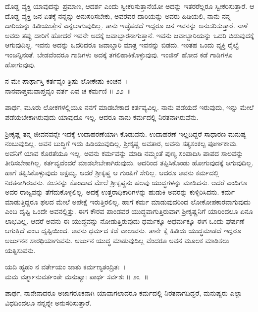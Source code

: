 ದೊಡ್ಡ ವ್ಯಕ್ತಿ ಯಾವುದನ್ನು ಪ್ರಮಾಣ, ಆದರ್ಶ ಎಂದು ಸ್ವೀಕರಿಸುತ್ತಾನೆಯೋ ಅದನ್ನು ಇತರರೆಲ್ಲರೂ ಸ್ವೀಕರಿಸುತ್ತಾರೆ. ಆ ದೊಡ್ಡ ವ್ಯಕ್ತಿ ಜನ ಏತಕ್ಕೆ ನನ್ನನ್ನು ಅನುಸರಿಸಬೇಕು, ಅವರವರ ದಾರಿಯನ್ನು ಅವರು ಹಿಡಿಯಲಿ, ನಾನು ನನ್ನ ದಾರಿಯನ್ನು ಹಿಡಿಯುತ್ತೇನೆ ಎನ್ನಲಾಗುವುದಿಲ್ಲ. ತಾನು ಇಚ್ಛೆಪಡದೆ ಇದ್ದರೂ ಜನ ಇವನನ್ನು ಅನುಸರಿಸುತ್ತಾರೆ. ನಾಳೆ ಅವರು ತಪ್ಪು ದಾರಿಗೆ ಹೋದರೆ ಇವನೇ ಅದಕ್ಕೆ ಜವಾಬ್ದಾರನಾಗುತ್ತಾನೆ. ಇವನು ಜವಾಬ್ದಾರಿಯನ್ನು ಒದರಿ ಬಿಡುವುದಕ್ಕೆ ಆಗುವುದಿಲ್ಲ. ಇವನು ಅದನ್ನು ಒದರಿದರೂ ಜವಾಬ್ದಾರಿ ಮಾತ್ರ ಇವನನ್ನು ಬಿಡದು. ಇಂತಹ ಒಂದು ವ್ಯಕ್ತಿ ರೈಲ್ವೆ ಇಂಜನ್ನಿನಂತೆ. ಬೇಡವೆಂದರೂ ಗಾಡಿಗಳು ಅದಕ್ಕೆ ತಗಲಿಹಾಕಿಕೊಳ್ಳುವುವು. ಇಂಜಿನ್ ಹೋದ ಕಡೆ ಗಾಡಿಗಳೂ ಹೋಗುವುವು.

\begin{shloka}
ನ ಮೇ ಪಾರ್ಥಾಸ್ತಿ ಕರ್ತವ್ಯಂ ತ್ರಿಷು ಲೋಕೇಷು ಕಿಂಚನ~।\\ನಾನವಾಪ್ತಮವಾಪ್ತವ್ಯಂ ವರ್ತ ಏವ ಚ ಕರ್ಮಣಿ \hfill॥ ೨೨~॥
\end{shloka}

\begin{artha}
ಪಾರ್ಥ, ಮೂರು ಲೋಕಗಳಲ್ಲಿಯೂ ನನಗೆ ಮಾಡಬೇಕಾದ ಕರ್ತವ್ಯವಿಲ್ಲ. ನಾನು ಪಡೆಯದೆ ಇರುವುದು, ಇನ್ನು ಮೇಲೆ ಪಡೆಯಬೇಕಾಗಿರುವುದು ಯಾವುದೂ ಇಲ್ಲ. ಆದರೂ ನಾನು ಕರ್ಮದಲ್ಲಿ ನಿರತನಾಗಿರುವೆನು.
\end{artha}

ಶ‍್ರೀಕೃಷ್ಣ ತನ್ನ ಜೀವನವನ್ನೇ ಇದಕ್ಕೆ ಉದಾಹರಣೆಯಾಗಿ ಕೊಡುವನು. ಉದಾಹರಣೆ ಇಲ್ಲದಿದ್ದರೆ ಸಾಧಾರಣ ಮನುಷ್ಯ ನಂಬುವುದಿಲ್ಲ. ಅವನ ಬುದ್ಧಿಗೆ ಇದು ಹಿಡಿಯುವುದಿಲ್ಲ. ಶ‍್ರೀಕೃಷ್ಣ ಅವತಾರ, ಅವನು ಸತ್ಯಸಂಕಲ್ಪ ಪೂರ್ಣಕಾಮ. ಅವನಿಗೆ ಯಾವ ಕೊರತೆಯೂ ಇಲ್ಲ. ಅವನು ಕರ್ಮವನ್ನು ಮಾಡಿ ನಮ್ಮಂತೆ ಪುಣ್ಯ ಸಂಪಾದಿಸಿ ಪಾಪದ ಸಾಲವನ್ನು ತೀರಿಸಬೇಕಾಗಿಲ್ಲ. ಕರ್ತವ್ಯವೆಂದರೆ ಮಾಡಲೇಬೇಕಾಗಿರುವುದು. ಅದರಿಂದ ತಪ್ಪಿಸಿಕೊಂಡು ಹೋಗುವುದಕ್ಕೆ ಆಗುವುದಿಲ್ಲ. ಹಾಗೆ ತಪ್ಪಿಸಿಕೊಳ್ಳುವುದು ಅಕ್ಷಮ್ಯ. ಆದರೆ ಶ‍್ರೀಕೃಷ್ಣ ಆ ಗುಂಪಿಗೆ ಸೇರಿಲ್ಲ. ಆದರೂ ಅವನು ಕರ್ಮದಲ್ಲಿ ನಿರತನಾಗಿರುವನು. ಕಂಸನನ್ನು ಕೊಂದಾದ ಮೇಲೆ ಶ‍್ರೀಕೃಷ್ಣನು ಹಲವು ಯುದ್ಧಗಳನ್ನು ಮಾಡಿದನು. ಆದರೆ ಎಂದಿಗೂ ಅವರ ರಾಜ್ಯವನ್ನು ತೆಗೆದುಕೊಳ್ಳಲಿಲ್ಲ. ಅದಕ್ಕೆ ಉತ್ತರಾಧಿಕಾರಿಗಳನ್ನು ಹುಡುಕಿ ಅವರನ್ನು ಕುಳ್ಳಿರಿಸಿದನು. ಕರ್ಮ ಮಾಡುತ್ತಿದ್ದರೂ ಫಲದ ಮೇಲೆ ಅಪೇಕ್ಷೆ ಇರುತ್ತಿರಲಿಲ್ಲ. ಹಾಗೆ ಕರ್ಮ ಮಾಡುವುದರಿಂದ ಲೋಕೋಪಕಾರವಾಗುವುದು ಎಂಬ ದೃಷ್ಟಿ ಒಂದೇ ಅವನಲ್ಲಿತ್ತು. ಈಗ ಕೌರವ ಪಾಂಡವರ ಯುದ್ಧವಾಗುತ್ತಿರುವಾಗ ಶ‍್ರೀಕೃಷ್ಣನಿಗೆ ಯಾರಿಂದಲೂ ಏನೂ ಲಾಭವಿಲ್ಲ. ಆದರೆ ಅವನು ಈ ಯುದ್ಧವನ್ನು ನೋಡುತ್ತಿರುವುದು ಧರ್ಮಕ್ಕೂ ಅಧರ್ಮಕ್ಕೂ ಈಗ ಒಂದು ಘರ್ಷಣೆ ಆಗುತ್ತಿದೆ ಎಂಬ ದೃಷ್ಟಿಯಿಂದ. ಅವನು ಧರ್ಮದ ಕಡೆ ವಾಲುವನು. ತಾನೇ ಕೈ ಹಿಡಿದು ಯುದ್ಧಮಾಡದೆ ಇದ್ದರೂ ಅರ್ಜುನನ ಸಾರಥಿಯಾಗುವನು. ಅರ್ಜುನ ಯುದ್ಧ ಮಾಡುವುದಿಲ್ಲ ವೆಂದರೂ ಅವನ ಮೂಲಕ ಮಾಡಿಸಲು ಯತ್ನಿಸುವನು.

\begin{shloka}
ಯದಿ ಹ್ಯಹಂ ನ ವರ್ತೇಯಂ ಜಾತು ಕರ್ಮಣ್ಯತಂದ್ರಿತಃ~।\\ಮಮ ವರ್ತ್ಮಾನುವರ್ತಂತೇ ಮನುಷ್ಯಾಃ ಪಾರ್ಥ ಸರ್ವಶಃ \hfill॥ ೨೩~॥
\end{shloka}

\begin{artha}
ಪಾರ್ಥ, ನಾನೇನಾದರೂ ಅಜಾಗರೂಕನಾಗಿ ಯಾವಾಗಲಾದರೂ ಕರ್ಮದಲ್ಲಿ ನಿರತನಾಗದಿದ್ದರೆ, ಮನುಷ್ಯರು ಎಲ್ಲಾ ವಿಧದಿಂದಲೂ ನನ್ನನ್ನೇ ಅನುಸರಿಸುತ್ತಾರೆ.
\end{artha}

